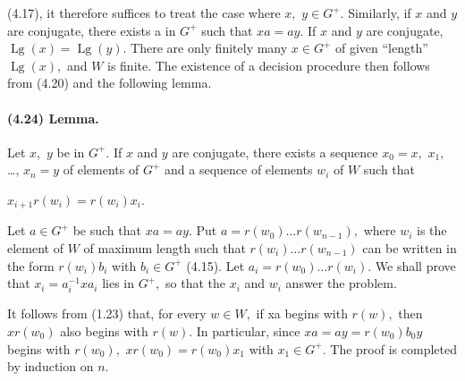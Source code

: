 \documentclass[10pt,a4paper]{article}
\begin{document}

(4.17), it therefore suffices to treat the case where \ensuremath{x,} \ensuremath{y\in{}G^{+}.} Similarly, if \ensuremath{x} and \ensuremath{y} are conjugate, there exists a in \ensuremath{G^{+}} such that \ensuremath{xa=ay.} If \ensuremath{x} and \ensuremath{y} are conjugate, \ensuremath{\operatorname{Lg}(x)=\operatorname{Lg}(y).} There are only finitely many \ensuremath{x\in{}G^{+}} of given ``length'' \ensuremath{\operatorname{Lg}(x),} and \ensuremath{W} is finite. The existence of a decision procedure then follows from (4.20) and the following lemma.\par

\paragraph{(4.24) Lemma.} Let \ensuremath{x,} \ensuremath{y} be in \ensuremath{G^{+}.} If \ensuremath{x} and \ensuremath{y} are conjugate, there exists a sequence \ensuremath{x_0=x,} \ensuremath{x_1,} \ldots{}, \ensuremath{x_n=y} of elements of \ensuremath{G^{+}} and a sequence of elements \ensuremath{w_i} of \ensuremath{W} such that

\ensuremath{x_{i+1}r(w_i)=r(w_i)x_i.}\par

Let \ensuremath{a\in{}G^{+}} be such that \ensuremath{xa=ay.} Put \ensuremath{a=r(w_0)\ldots{}r(w_{n-1}),} where \ensuremath{w_i} is the element of \ensuremath{W} of maximum length such that \ensuremath{r(w_i)\ldots{}r(w_{n-1})} can be written in the form \ensuremath{r(w_i)b_i} with \ensuremath{b_i\in{}G^{+}} (4.15). Let \ensuremath{a_i=r(w_0)\ldots{}r(w_i).} We shall prove that \ensuremath{x_i=a_i^{-1}xa_i} lies in \ensuremath{G^{+},} so that the \ensuremath{x_i} and \ensuremath{w_i} answer the problem.\par

It follows from (1.23) that, for every \ensuremath{w\in{}W,} if xa begins with \ensuremath{r(w),} then \ensuremath{xr(w_0)} also begins with \ensuremath{r(w).} In particular, since \ensuremath{xa=ay=r(w_0)b_0y} begins with \ensuremath{r(w_0),} \ensuremath{xr(w_0)=r(w_0)x_1} with \ensuremath{x_1\in{}G^{+}.} The proof is completed by induction on \ensuremath{n.}\par
\end{document}
